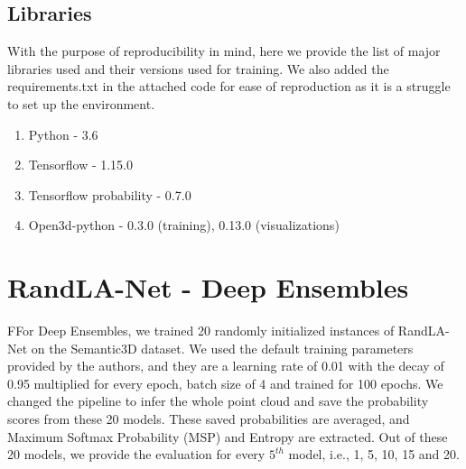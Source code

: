     \subsection*{Libraries}
    With the purpose of reproducibility in mind, here we provide the list of major libraries used and their versions used for training.
    We also added the requirements.txt in the attached code for ease of reproduction as it is a struggle to set up the environment.
    \begin{enumerate}
        \item Python - 3.6
        \item Tensorflow - 1.15.0
        \item Tensorflow probability - 0.7.0
        \item Open3d-python - 0.3.0 (training), 0.13.0 (visualizations)
    \end{enumerate}
    
    \section{RandLA-Net - Deep Ensembles}
    FFor Deep Ensembles, we trained 20 randomly initialized instances of RandLA-Net on the Semantic3D dataset.
    We used the default training parameters provided by the authors, and they are a learning rate of 0.01 with the decay of 0.95 multiplied for every epoch, batch size of 4 and trained for 100 epochs.
    We changed the pipeline to infer the whole point cloud and save the probability scores from these 20 models.
    These saved probabilities are averaged, and Maximum Softmax Probability (MSP) and Entropy are extracted.
    Out of these 20 models, we provide the evaluation for every $5^{th}$ model, i.e., 1, 5, 10, 15 and 20.
